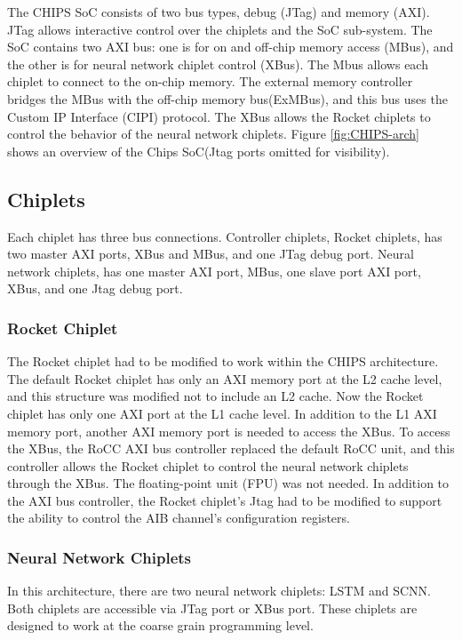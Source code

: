 \documentclass[../main.tex]{subfiles}
\begin{document}
The CHIPS SoC consists of two bus types, debug (JTag) and memory (AXI). JTag allows interactive control over the chiplets and the SoC sub-system. The SoC contains two AXI bus: one is for on and off-chip memory access (MBus), and the other is for neural network chiplet control (XBus).  The Mbus allows each chiplet to connect to the on-chip memory. The external memory controller bridges the MBus with the off-chip memory bus(ExMBus), and this bus uses the Custom IP Interface (CIPI) protocol. The XBus allows the Rocket chiplets to control the behavior of the neural network chiplets. Figure \ref{fig:CHIPS-arch} shows an overview of the Chips SoC(Jtag ports omitted for visibility).


\subsection{Chiplets}
Each chiplet has three bus connections. Controller chiplets, Rocket chiplets, has two master AXI ports, XBus and MBus, and one JTag debug port. Neural network chiplets, has one master AXI port, MBus, one slave port AXI port, XBus, and one Jtag debug port.

\subsubsection{Rocket Chiplet}
The Rocket chiplet had to be modified to work within the CHIPS architecture. The default Rocket chiplet has only an AXI memory port at the L2 cache level, and this structure was modified not to include an L2 cache. Now the Rocket chiplet has only one AXI port at the L1 cache level. In addition to the L1 AXI memory port, another AXI memory port is needed to access the XBus. To access the XBus, the RoCC AXI bus controller replaced the default RoCC unit, and this controller allows the Rocket chiplet to control the neural network chiplets through the XBus. The floating-point unit (FPU) was not needed. In addition to the AXI bus controller, the Rocket chiplet's Jtag had to be modified to support the ability to control the AIB channel's configuration registers.

\subsubsection{Neural Network Chiplets}
In this architecture, there are two neural network chiplets: LSTM and SCNN. Both chiplets are accessible via JTag port or XBus port. These chiplets are designed to work at the coarse grain programming level. 
\end{document}
